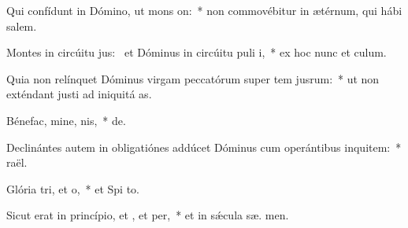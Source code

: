 \item Qui confídunt in Dómino, ut mons on:~* non commovébitur in ætérnum, qui hábi  salem.
\item Montes in circúitu jus:~\pscross{} et Dóminus in circúitu puli i,~* ex hoc nunc et   culum.
\item Quia non relínquet Dóminus virgam peccatórum super tem jusrum:~* ut non exténdant justi ad iniquitá  as.
\item Bénefac, mine, nis,~*   de.
\item Declinántes autem in obligatiónes addúcet Dóminus cum operántibus inquitem:~*   raël.
\item Glória tri, et o,~* et Spi to.
\item Sicut erat in princípio, et , et per,~* et in sǽcula sæ. men.
